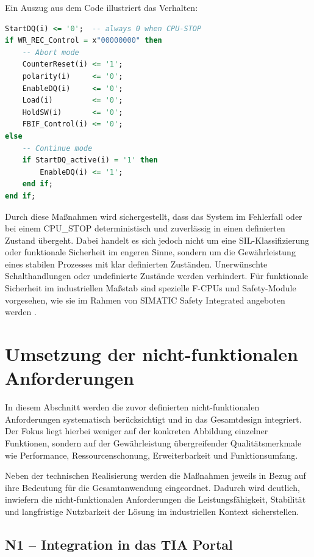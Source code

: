 Ein Auszug aus dem Code illustriert das Verhalten:

\begin{lstlisting}[language=VHDL, basicstyle=\ttfamily\footnotesize,  
  label={lst:cpu_stop_safe},captionpos=b,caption={Rücksetzen aller Ausgänge und Register im CPU\_STOP-Fall}]
StartDQ(i) <= '0';  -- always 0 when CPU-STOP
if WR_REC_Control = x"00000000" then
    -- Abort mode
    CounterReset(i) <= '1';
    polarity(i)     <= '0';
    EnableDQ(i)     <= '0';
    Load(i)         <= '0';
    HoldSW(i)       <= '0';
    FBIF_Control(i) <= '0';
else
    -- Continue mode
    if StartDQ_active(i) = '1' then
        EnableDQ(i) <= '1'; 
    end if;
end if;
\end{lstlisting}

Durch diese Maßnahmen wird sichergestellt, dass das System im Fehlerfall oder bei einem CPU\_STOP deterministisch und zuverlässig in einen definierten Zustand übergeht. Dabei handelt es sich jedoch nicht um eine SIL-Klassifizierung oder funktionale Sicherheit im engeren Sinne, sondern um die Gewährleistung eines stabilen Prozesses mit klar definierten Zuständen. Unerwünschte Schalthandlungen oder undefinierte Zustände werden verhindert.  
Für funktionale Sicherheit im industriellen Maßstab sind spezielle F-CPUs und Safety-Module vorgesehen, wie sie im Rahmen von SIMATIC Safety Integrated angeboten werden \cite{simatic_safety_integrated}.

\section{Umsetzung der nicht-funktionalen Anforderungen}

In diesem Abschnitt werden die zuvor definierten nicht-funktionalen Anforderungen systematisch berücksichtigt und in das Gesamtdesign integriert.  
Der Fokus liegt hierbei weniger auf der konkreten Abbildung einzelner Funktionen, sondern auf der Gewährleistung übergreifender Qualitätsmerkmale wie Performance, Ressourcenschonung, Erweiterbarkeit und Funktionsumfang.  

Neben der technischen Realisierung werden die Maßnahmen jeweils in Bezug auf ihre Bedeutung für die Gesamtanwendung eingeordnet.  
Dadurch wird deutlich, inwiefern die nicht-funktionalen Anforderungen die Leistungsfähigkeit, Stabilität und langfristige Nutzbarkeit der Lösung im industriellen Kontext sicherstellen.  

\subsection*{N1 – Integration in das TIA Portal}

